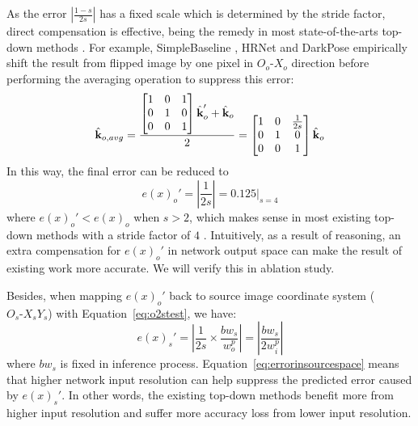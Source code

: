 \documentclass[10pt,journal,compsoc]{IEEEtran}
\begin{document}
As the error $|\frac{1-s}{2s}|$ has a fixed scale which is determined by the stride factor, direct compensation is effective, being the remedy in most state-of-the-arts top-down methods \cite{CPN, MSPN, SBNet, HRNet, DARK}. For example, SimpleBaseline \cite{SBNet}, HRNet \cite{HRNet} and DarkPose \cite{DARK} empirically shift the result from flipped image by one pixel in $O_o\text{-}X_o$ direction before performing the averaging operation to suppress this error:
\begin{equation}
    \hat{\textbf{k}}_{o,avg} = \frac{\begin{bmatrix} 1 & 0 & 1 \\
                                            0 & 1 & 0 \\
                                            0 & 0 &1 \end{bmatrix}\hat{\textbf{k}}_{o}' + \hat{\textbf{k}}_o}{2} = \begin{bmatrix} 1 & 0 & \frac{1}{2s} \\
                                            0 & 1 & 0 \\
                                            0 & 0 &1 \end{bmatrix}\hat{\textbf{k}}_o\\
\end{equation}
In this way, the final error can be reduced to
\begin{equation}
    \label{eq:errorshift1pixel}
    e(x)_o' = |\frac{1}{2s}|=0.125|_{s=4}
\end{equation}
where $e(x)_o'< e(x)_o$ when $s>2$, which makes sense in most existing top-down methods with a stride factor of $4$ \cite{CPN, MSPN, SBNet, HRNet, DARK}. Intuitively, as a result of reasoning, an extra compensation for $e(x)_o'$ in network output space can make the result of existing work more accurate. We will verify this in ablation study.

Besides, when mapping $e(x)_o'$ back to source image coordinate system ($O_s\text{-}X_sY_s$) with Equation~\ref{eq:o2stest}, we have:
\begin{equation}
\label{eq:errorinsourcespace}
    e(x)_s' = |\frac{1}{2s}\times\frac{bw_s}{w_o^p}| = |\frac{bw_s}{2w_i^p}|
\end{equation}
where $bw_s$ is fixed in inference process. Equation~\ref{eq:errorinsourcespace} means that higher network input resolution can help suppress the predicted error caused by $e(x)_s'$. In other words, the existing top-down methods benefit more from higher input resolution and suffer more accuracy loss from lower input resolution.
\end{document}

